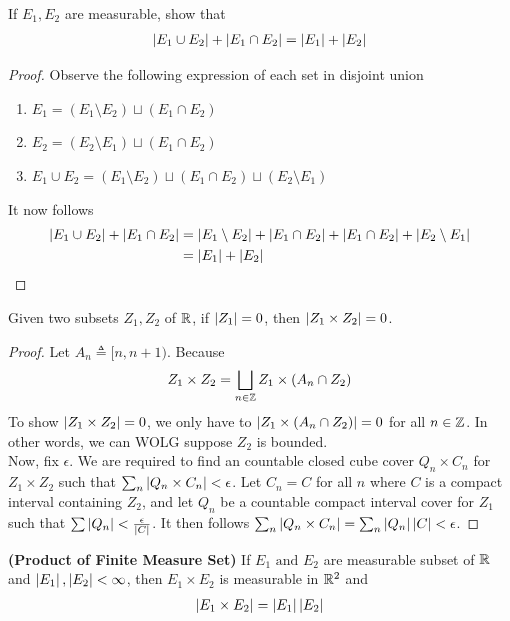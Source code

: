 \documentclass{report}
\begin{document}
\begin{question}{}{}
If $E_1,E_2$ are measurable, show that 
\begin{align*}
\left|E_1\cup E_2\right|+ \left|E_1 \cap E_2\right|=\left|E_1\right|+\left|E_2\right|
\end{align*}
\end{question}
\begin{proof}
Observe the following expression of each set in disjoint union
\begin{enumerate}[label=(\alph*)]
  \item $E_1=(E_1\setminus E_2)\sqcup (E_1\cap E_2)$ 
  \item $E_2=(E_2\setminus E_1)\sqcup (E_1\cap E_2)$ 
  \item $E_1\cup E_2=(E_1\setminus E_2)\sqcup (E_1\cap E_2)\sqcup (E_2\setminus E_1)$
\end{enumerate}
It now follows 
\begin{align*}
\left|E_1\cup E_2\right|+ \left|E_1 \cap E_2\right|&= \left|E_1\setminus E_2\right|+\left|E_1\cap E_2\right|+\left|E_1\cap E_2\right|+\left|E_2\setminus E_1\right|\\
&=\left|E_1\right|+ \left|E_2\right|
\end{align*}
\end{proof}
\begin{lemma}
\label{zme}
Given two subsets $Z_1,Z_2$ of  $\mathbb{R}$,  if $\left|Z_1\right|=0$, then $\left|Z_1 \times Z_2\right|=0$. 
\end{lemma}
\begin{proof}  
Let $A_n\triangleq [n,n+1)$. Because 
\begin{align*}
Z_1 \times Z_2 = \bigsqcup _{n\in\mathbb{Z}} Z_1 \times (A_n \cap  Z_2)
\end{align*}
To show $\left|Z_1 \times Z_2\right|=0$, we only have to $\left|Z_1 \times (A_n \cap Z_2)\right|=0$ for all $n\in\mathbb{Z}$. In other words, we can WOLG suppose $Z_2$ is bounded.\\ 

Now, fix $\epsilon $. We are required to find an countable closed cube cover $Q_n\times C_n$ for $Z_1 \times Z_2$ such that $\sum_n \left|Q_n\times C_n\right|< \epsilon $. Let $C_n=C$ for all $n$ where  $C$ is a compact interval containing $Z_2$, and let  $Q_n$ be a countable compact interval cover for  $Z_1$ such that $\sum \left|Q_n\right|< \frac{\epsilon }{\left|C\right|}$. It then follows $\sum_n \left|Q_n\times C_n\right|= \sum_n \left|Q_n\right|\left|C\right|< \epsilon $. 
\end{proof}
\begin{theorem}
\label{PoFM}
\textbf{(Product of Finite Measure Set)} If $E_1\text{ and }E_2$ are measurable subset of $\mathbb{R} $ and $\left|E_1\right|,\left|E_2\right|<\infty$, then $E_1\times E_2$ is measurable in $\mathbb{R}^2$ and 
 \begin{align*}
\left|E_1\times E_2\right| = \left|E_1\right| \left|E_2\right|
\end{align*}
\end{theorem}
\end{document}
